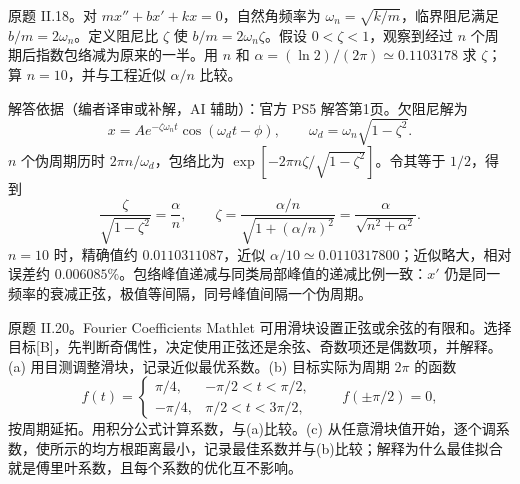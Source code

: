 \begin{exercise}\label{cw:ps5-II-18}
原题 II.18。对 $mx''+bx'+kx=0$，自然角频率为 $\omega_n=\sqrt{k/m}$，临界阻尼满足 $b/m=2\omega_n$。定义阻尼比 $\zeta$ 使 $b/m=2\omega_n\zeta$。假设 $0<\zeta<1$，观察到经过 $n$ 个周期后指数包络减为原来的一半。用 $n$ 和 $\alpha=(\ln2)/(2\pi)\simeq0.1103178$ 求 $\zeta$；算 $n=10$，并与工程近似 $\alpha/n$ 比较。
\end{exercise}
\begin{solution}
解答依据（编者译审或补解，AI 辅助）：官方 PS5 解答第1页。欠阻尼解为
\[
 x=Ae^{-\zeta\omega_n t}\cos(\omega_dt-\phi),
 \qquad\omega_d=\omega_n\sqrt{1-\zeta^2}.
\]
$n$ 个伪周期历时 $2\pi n/\omega_d$，包络比为 $\exp[-2\pi n\zeta/\sqrt{1-\zeta^2}]$。令其等于 $1/2$，得到
\[
 \frac{\zeta}{\sqrt{1-\zeta^2}}=\frac\alpha n,
 \qquad\zeta=\frac{\alpha/n}{\sqrt{1+(\alpha/n)^2}}
 =\frac\alpha{\sqrt{n^2+\alpha^2}}.
\]
$n=10$ 时，精确值约 $0.0110311087$，近似 $\alpha/10\simeq0.0110317800$；近似略大，相对误差约 $0.006085\%$。包络峰值递减与同类局部峰值的递减比例一致：$x'$ 仍是同一频率的衰减正弦，极值等间隔，同号峰值间隔一个伪周期。
\end{solution}
\begin{exercise}\label{cw:ps5-II-20}
原题 II.20。Fourier Coefficients Mathlet 可用滑块设置正弦或余弦的有限和。选择目标[B]，先判断奇偶性，决定使用正弦还是余弦、奇数项还是偶数项，并解释。
(a) 用目测调整滑块，记录近似最优系数。(b) 目标实际为周期 $2\pi$ 的函数
\[
 f(t)=\begin{cases}\pi/4,&-\pi/2<t<\pi/2,\\-\pi/4,&\pi/2<t<3\pi/2,\end{cases}
 \qquad f(\pm\pi/2)=0,
\]
按周期延拓。用积分公式计算系数，与(a)比较。(c) 从任意滑块值开始，逐个调系数，使所示的均方根距离最小，记录最佳系数并与(b)比较；解释为什么最佳拟合就是傅里叶系数，且每个系数的优化互不影响。
\end{exercise}
